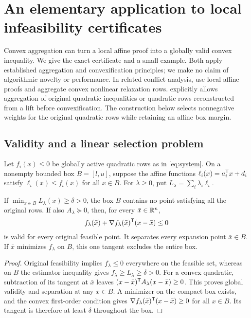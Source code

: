 \section{An elementary application to local infeasibility certificates}
\label{app:application}

Convex aggregation can turn a local affine proof into a globally valid
convex inequality. We give the exact certificate and a small example.
Both apply established aggregation and convexification principles; we
make no claim of algorithmic novelty or performance. In related
conflict analysis,
\citet{BertholdWitzig2021} use local affine proofs and aggregate
convex nonlinear relaxation rows. \citet{Dong2016} explicitly
allows aggregation of original quadratic inequalities or quadratic
rows reconstructed from a lift before convexification. The
construction below selects nonnegative weights for the original
quadratic rows while retaining an affine box margin.

\subsection{Validity and a linear selection problem}

Let $f_i(x)\leq0$ be globally active quadratic rows as in
\eqref{eq:system}. On a nonempty bounded box $B=[l,u]$, suppose
the affine functions
$\ell_i(x)=a_i^{\mathsf T} x+d_i$ satisfy
$\ell_i(x)\leq f_i(x)$ for all $x\in B$.
For $\lambda\geq0$, put
$L_\lambda=\sum_i\lambda_i\ell_i$.

\begin{proposition}\label{prop:local-certificate}
If $\min_{x\in B}L_\lambda(x)\geq\delta>0$, the box $B$
contains no point satisfying all the original rows. If also
$A_\lambda\succeq0$, then, for every $\bar x\in\mathbb R^n$,
\begin{equation}\label{eq:global-tangent}
 f_\lambda(\bar x)+\nabla f_\lambda(\bar x)^{\mathsf T}(x-\bar x)
 \leq0
\end{equation}
is valid for every original feasible point. It separates every
expansion point $\bar x\in B$. If $\bar x$ minimizes
$f_\lambda$ on $B$, this one tangent excludes the entire box.
\end{proposition}
\begin{proof}
Original feasibility implies $f_\lambda\leq0$ everywhere on the
feasible set, whereas on $B$ the estimator inequality gives
$f_\lambda\geq L_\lambda\geq\delta>0$.
For a convex quadratic, subtraction of its tangent at $\bar x$
leaves $(x-\bar x)^{\mathsf T} A_\lambda(x-\bar x)\geq0$.
This proves global validity and separation at any $\bar x\in B$.
A minimizer on the compact box exists, and the convex first-order
condition gives
$\nabla f_\lambda(\bar x)^{\mathsf T}(x-\bar x)\geq0$ for
all $x\in B$. Its tangent is therefore at least $\delta$ throughout
the box.
\end{proof}

